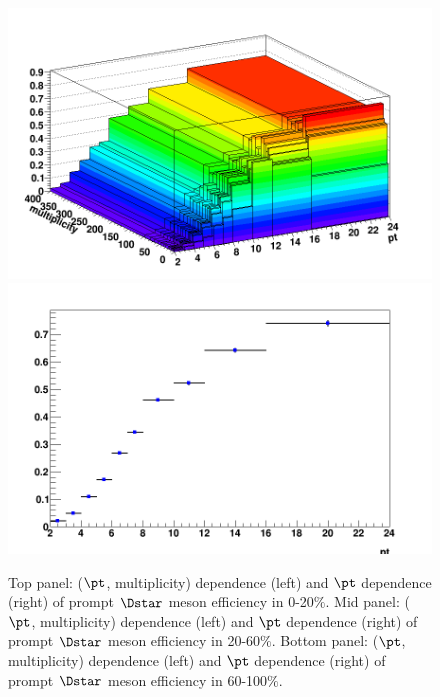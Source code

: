 \begin{figure}[h]
	\includegraphics[width=.48\linewidth]{figuresVsCent/Dstar/EffAndFeed/EfficiencyMap_2D_DStar_c_60100_ZNA_wLimAcc_Plot.png
}
	\includegraphics[width=.48\linewidth]{figuresVsCent/Dstar/EffAndFeed/EfficiencyMap_1D_DStar_c_60100_ZNA_wLimAcc_Plot.png
}
	\caption{Top panel: ($\pt$, multiplicity) dependence (left) and $\pt$ dependence (right) of prompt $\Dstar$ meson efficiency in 0-20$\%$.
Mid panel: ($\pt$, multiplicity) dependence (left) and $\pt$ dependence (right) of prompt $\Dstar$ meson efficiency in 20-60$\%$.
Bottom panel: ($\pt$, multiplicity) dependence (left) and $\pt$ dependence (right) of prompt $\Dstar$ meson efficiency in 60-100$\%$.}
	\label{fig:dstarEff}	
\end{figure}

